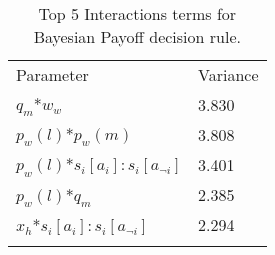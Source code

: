 \begin{table}[H]
\caption{Top 5 Interactions terms for Bayesian Payoff decision rule. \label{tab:sa_interaction_payoff_group_iqr_iqr}}
\begin{tabular} {ll}
\hline\noalign{\smallskip}
Parameter & Variance \\
\noalign{\smallskip}\svhline\noalign{\smallskip}
\(q_{m}\)*\(w_{w}\) & 3.830\\
\(p_{w}(l)\)*\(p_{w}(m)\) & 3.808\\
\(p_{w}(l)\)*\(s_{i}[a_{i}]:s_{i}[a_{\neg i}]\) & 3.401\\
\(p_{w}(l)\)*\(q_{m}\) & 2.385\\
\(x_{h}\)*\(s_{i}[a_{i}]:s_{i}[a_{\neg i}]\) & 2.294\\ 
\noalign{\smallskip}\hline\noalign{\smallskip}
\end{tabular}
\end{table}

